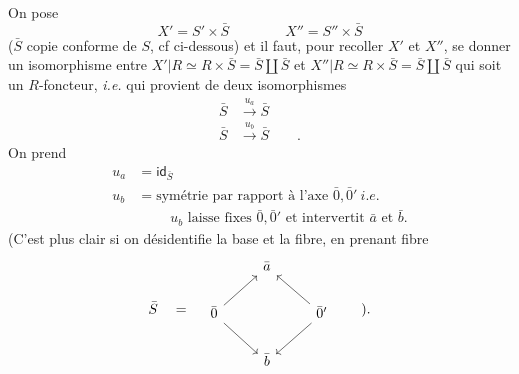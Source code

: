 
On pose
\[ X' = S' \times \bar S \qquad\qquad X'' = S'' \times \bar S \]
($\bar S$ copie conforme de $S$, cf ci-dessous) et il faut, pour recoller $X'$ et $X''$, se donner un isomorphisme entre $X'|R \simeq R \times \bar S = \bar S \amalg \bar S$ et $X''|R \simeq R \times \bar S = \bar S \amalg \bar S$ qui soit un $R$-foncteur, \textit{i.e.} qui provient de deux isomorphismes
\[
\begin{aligned}
\bar S &\xrightarrow{u_a} \bar S \\
\bar S &\xrightarrow{u_b} \bar S \qquad .
\end{aligned}
\]
On prend
\[
\begin{aligned}
u_a &= \mathsf{id}_{\bar S} \\
u_b &= \text{symétrie par rapport à l'axe } \bar 0, \bar 0' \ \textit{i.e.} %
\\
&\phantom{=}\quad u_b \text{ laisse fixes } \bar 0, \bar 0' \text{ et intervertit } \bar a \text{ et } \bar b.
\end{aligned}
\]
(C'est plus clair si on désidentifie la base et la fibre, en prenant fibre
\[
\bar S \quad = \quad
\begin{tikzcd}
 & \bar a & \\
\bar 0 \arrow[ur] \arrow[dr] & & \bar 0' \arrow[ul] \arrow[dl] \\
 & \bar b &
\end{tikzcd}
\qquad ).
\]

